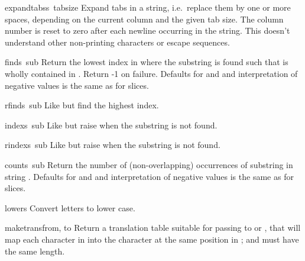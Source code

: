 \begin{funcdesc}{expandtabs}{s\, tabsize}
Expand tabs in a string, i.e.\ replace them by one or more spaces,
depending on the current column and the given tab size.  The column
number is reset to zero after each newline occurring in the string.
This doesn't understand other non-printing characters or escape
sequences.
\end{funcdesc}

\begin{funcdesc}{find}{s\, sub}
Return the lowest index in  where the substring  is
found such that  is wholly contained in
.  Return -1 on failure.
Defaults for  and  and interpretation of negative
values is the same as for slices.
\end{funcdesc}

\begin{funcdesc}{rfind}{s\, sub}
Like  but find the highest index.
\end{funcdesc}

\begin{funcdesc}{index}{s\, sub}
Like  but raise  when the substring is
not found.
\end{funcdesc}

\begin{funcdesc}{rindex}{s\, sub}
Like  but raise  when the substring is
not found.
\end{funcdesc}

\begin{funcdesc}{count}{s\, sub}
Return the number of (non-overlapping) occurrences of substring
 in string .
Defaults for  and  and interpretation of negative
values is the same as for slices.
\end{funcdesc}

\begin{funcdesc}{lower}{s}
Convert letters to lower case.
\end{funcdesc}

\begin{funcdesc}{maketrans}{from, to}
Return a translation table suitable for passing to 
or , that will map each character in  
into the character at the same position in ;  and
 must have the same length. 
\end{funcdesc}

